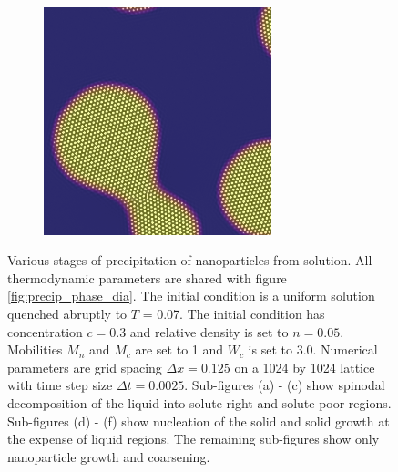 \documentclass[showkeys, prb, reprint]{revtex4-1}
\begin{document}
\begin{figure}
\begin{subfigure}[b]{0.3\columnwidth}
        \label{fig:crystalgrowth2}
        \caption{}
    \end{subfigure}
    ~ 
    \begin{subfigure}[b]{0.3\columnwidth}
        \includegraphics[width=\textwidth]{crystalgrowth3}
        \label{fig:crystalgrowth3}
        \caption{}
    \end{subfigure}
    \caption[Stages of precipitation of nanoparticles from solution]{
        \label{fig:precipitation}
        Various stages of precipitation of nanoparticles from solution. All
        thermodynamic parameters are shared with figure
        \ref{fig:precip_phase_dia}. The initial condition is a uniform solution
        quenched abruptly to $T$ = 0.07. The initial condition has
        concentration $c = 0.3$ and relative density is set to $n = 0.05$. Mobilities
        $M_n$ and $M_c$ are set to 1 and $W_c$ is set to 3.0. Numerical
        parameters are grid spacing $\Delta x = 0.125$ on a 1024 by 1024
        lattice with time step size $\Delta t = 0.0025$. Sub-figures (a) - (c)
        show spinodal decomposition of the liquid into solute right and solute
        poor regions. Sub-figures (d) - (f) show nucleation of the solid and
        solid growth at the expense of liquid regions.  The remaining
        sub-figures show only nanoparticle growth and coarsening.
    }
\end{figure}
%
\end{document}
